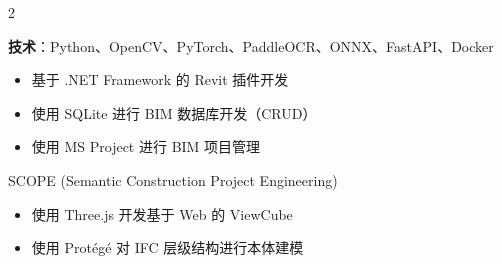 \documentclass[10pt,a4paper,withhyper]{../altacv}
\begin{document}
\begin{paracol}{2}
  \vspace{1.0em}

  \textbf{技术}：Python、OpenCV、PyTorch、PaddleOCR、ONNX、FastAPI、Docker

  \vspace{1.5em}




  \vspace{1.0em}

  
  \vspace{1.0em}

  \begin{itemize}
    \item 基于 .NET Framework 的 Revit 插件开发
    \item 使用 SQLite 进行 BIM 数据库开发（CRUD）
    \item 使用 MS Project 进行 BIM 项目管理
  \end{itemize}

  \vspace{1.0em}


  \vspace{1.0em}

  SCOPE (Semantic Construction Project Engineering)
  \begin{itemize}
    \item 使用 Three.js 开发基于 Web 的 ViewCube
    \item 使用 Protégé 对 IFC 层级结构进行本体建模
  \end{itemize}

  \vspace{1.0em}

  \divider



  \medskip


\end{paracol}
\end{document}
